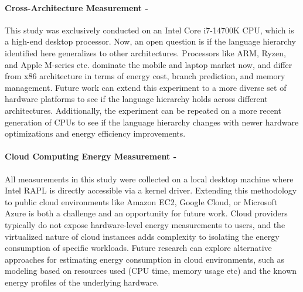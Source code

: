 \paragraph{Cross-Architecture Measurement -}
This study was exclusively conducted on an Intel Core i7-14700K CPU, which is a high-end desktop processor. Now, an open question is if the language hierarchy identified here generalizes to other architectures. Processors like ARM, Ryzen, and Apple M-series etc. dominate the mobile and laptop market now, and differ from x86 architecture in terms of energy cost, branch prediction, and memory management. Future work can extend this experiment to a more diverse set of hardware platforms to see if the language hierarchy holds across different architectures. Additionally, the experiment can be repeated on a more recent generation of CPUs to see if the language hierarchy changes with newer hardware optimizations and energy efficiency improvements.


\paragraph{Cloud Computing Energy Measurement -}
All measurements in this study were collected on a local desktop machine where Intel RAPL is directly accessible via a kernel driver. Extending this methodology to public cloud environments like Amazon EC2, Google Cloud, or Microsoft Azure is both a challenge and an opportunity for future work. Cloud providers typically do not expose hardware-level energy measurements to users, and the virtualized nature of cloud instances adds complexity to isolating the energy consumption of specific workloads. Future research can explore alternative approaches for estimating energy consumption in cloud environments, such as modeling based on resources used (CPU time, memory usage etc) and the known energy profiles of the underlying hardware.
